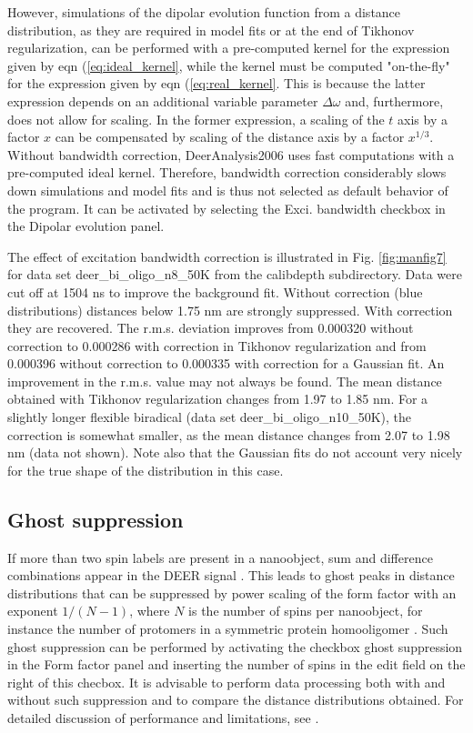 \documentclass{article}
\begin{document}
However, simulations of the dipolar evolution function from a distance distribution, as they are required in model fits or at the end of Tikhonov regularization, can be performed with a pre-computed kernel for the expression given by eqn (\ref{eq:ideal_kernel}, while the kernel must be computed "on-the-fly" for the expression given by eqn (\ref{eq:real_kernel}. This is because the latter expression depends on an additional variable parameter $\Delta \omega$ and, furthermore, does not allow for scaling. In the former expression, a scaling of the $t$ axis by a factor $x$ can be compensated by scaling of the distance axis by a factor $x^{1/3}$. Without bandwidth correction, DeerAnalysis2006 uses fast computations with a pre-computed ideal kernel. Therefore, bandwidth correction considerably slows down simulations and model fits and is thus not selected as default behavior of the program. It can be activated by selecting the {\ttfamily Exci. bandwidth} checkbox in the {\ttfamily Dipolar evolution} panel.

The effect of excitation bandwidth correction is illustrated in Fig. \ref{fig:manfig7} for data set {\ttfamily deer\_bi\_oligo\_n8\_50K} from the {\ttfamily calibdepth} subdirectory. Data were cut off at 1504 ns to improve the background fit. Without correction (blue distributions) distances below 1.75 nm are strongly suppressed. With correction they are recovered. The r.m.s. deviation improves from 0.000320 without correction to 0.000286 with correction in Tikhonov regularization and from 0.000396 without correction to 0.000335 with correction for a Gaussian fit. An improvement in the r.m.s. value may not always be found. The mean distance obtained with Tikhonov regularization changes from 1.97 to 1.85 nm. For a slightly longer flexible biradical (data set {\ttfamily deer\_bi\_oligo\_n10\_50K}), the correction is somewhat smaller, as the mean distance changes from 2.07 to 1.98 nm (data not shown). Note also that the Gaussian fits do not account very nicely for the true shape of the distribution in this case.

\subsection{Ghost suppression}
\label{ghost_suppression}
If more than two spin labels are present in a nanoobject, sum and difference combinations appear in the DEER signal \cite{jeschke2009b}. This leads to ghost peaks in distance distributions that can be suppressed by power scaling of the form factor with an exponent $1/(N-1)$, where $N$ is the number of spins per nanoobject, for instance the number of protomers in a symmetric protein homooligomer \cite{vonHagens2013}. Such ghost suppression can be performed by activating the checkbox {\ttfamily ghost suppression} in the {\ttfamily Form factor} panel and inserting the number of spins in the edit field on the right of this checbox. It is advisable to perform data processing both with and without such suppression and to compare the distance distributions obtained. For detailed discussion of performance and limitations, see \cite{vonHagens2013}.
\end{document}
